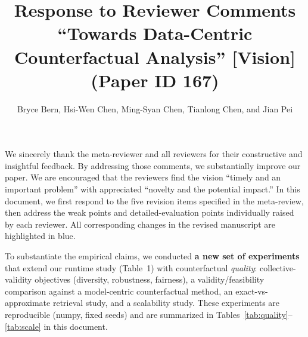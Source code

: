 \documentclass{article}
\begin{document}
\sloppy

\title{\textbf{Response to Reviewer Comments}\\
\large ``Towards Data-Centric Counterfactual Analysis'' [Vision] (Paper ID 167)}

\author{Bryce Bern, Hsi-Wen Chen, Ming-Syan Chen, Tianlong Chen, and Jian Pei}

\maketitle

We sincerely thank the meta-reviewer and all reviewers for their constructive and insightful feedback. By addressing those comments, we substantially improve our paper. We are encouraged that the reviewers find the vision ``timely and an important problem'' with appreciated ``novelty and the potential impact.'' In this document, we first respond to the five revision items specified in the meta-review, then address the weak points and detailed-evaluation points individually raised by each reviewer. All corresponding changes in the revised manuscript are highlighted in {\color{blue}blue}.

To substantiate the empirical claims, we conducted \textbf{a new set of experiments} that extend our runtime study (Table~1) with counterfactual \emph{quality}: collective-validity objectives (diversity, robustness, fairness), a validity/feasibility comparison against a model-centric counterfactual method, an exact-vs-approximate retrieval study, and a scalability study. These experiments are reproducible (numpy, fixed seeds) and are summarized in Tables~\ref{tab:quality}--\ref{tab:scale} in this document.








\end{document}
